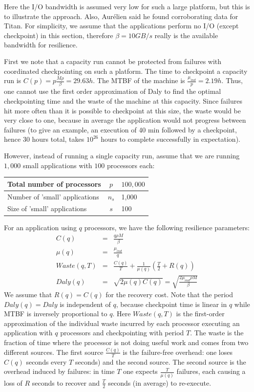 \documentclass{article}
\newcommand{\ema}[1]{\ensuremath{#1}}
\newcommand{\Waste}{\ema{\mathit{Waste}\xspace}}
\newcommand{\Daly}{\ema{\mathit{Daly}\xspace}}
\begin{document}
Here the I/O bandwidth is assumed very low for such a large platform, but this is 
to illustrate the approach. Also, Aurélien said he found corroborating data for Titan.
For simplicity, we assume that the applications perform no I/O (except checkpoint) in this section, therefore $\beta=10GB/s$ really is the available bandwidth for resilience.

First we note that a capacity run cannot be protected from failures with
coordinated checkpointing on such a platform.
The time to checkpoint a capacity run is $C(p) = p\frac{M \rho}{\beta} = 29.63h$. The MTBF of the machine is $\frac{\mu_{ind}}{p} = 2.19h$. Thus, one cannot use the first order approximation of Daly to find the optimal checkpointing time and the waste of the machine at this capacity. Since failures hit more often than it is possible to checkpoint at this size, the waste would be very close to one, because in average the application would not progress between failures (to give an example, an execution of 40 min
followed by a checkpoint, hence 30 hours total, takes $10^{26}$ hours to complete successfully in expectation).

However, instead of running a single capacity run, assume that we are running
$1,000$ small applications with $100$ processors each:
\begin{center}
\begin{tabular}{lcl}
  Total number of processors & $p$ & $100,000$\\\hline
  Number of 'small' applications & $n_{s}$ & 1,000\\\hline
  Size of 'small' applications & $s$ & 100\\\hline
\end{tabular}
\end{center}


For an application using $q$ processors, we have the following resilience parameters:
\begin{eqnarray}
C(q) &=& \frac{q\rho M}{\beta}\\
\mu(q) &=& \frac{\mu_{ind}}{q}\\
\Waste(q, T) &=& \frac{C(q)}{T} + \frac{1}{\mu(q)}\left(\frac{T}{2}+R(q)\right)\\
\Daly(q) &=& \sqrt{2\mu(q)C(q)} = \sqrt{\frac{2\mu_{ind}\rho M}{\beta}}
\end{eqnarray}
We assume that $R(q) =C(q)$ for the recovery cost. Note that the period $\Daly(q)=\Daly$ is independent of
$q$, because checkpoint time is linear in $q$ while MTBF is inversely proportional to $q$.
Here $\Waste(q,T)$ is the first-order approximation of the individual waste incurred
by each processor executing an application with $q$ 
processors and checkpointing with period $T$. 
The waste is the fraction of time where the processor is not doing useful work and comes from two different sources. The first source $\frac{C(q)}{T} $ is the failure-free overhead:
one loses $C(q)$ seconds every $T$ seconds) and the second source. The second source is the overhead induced by failures: in time $T$ one expects $ \frac{T}{\mu(q)}$
failures, each causing a loss of $R$ seconds to recover and $\frac{T}{2}$ seconds (in average) to re-execute.
\end{document}

